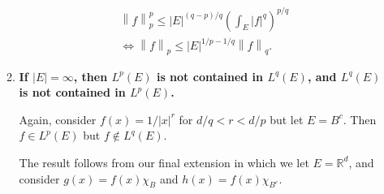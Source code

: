\documentclass[a4paper,12pt]{article}
\newcommand{\norm}[1]{\left\lVert#1\right\rVert}
\begin{document}
\begin{enumerate}
\begin{enumerate}
\begin{gather*}
                    \norm{f}_p^p \leq |E|^{(q - p) / q} \left( \int_E |f|^q \right)^{p/q} \\
                    \Leftrightarrow \norm{f}_p \leq |E|^{1/p - 1/q} \norm{f}_q.
                \end{gather*}
            \item
                \boldmath\textbf{If $|E| = \infty$, then $L^p(E)$ is not contained in $L^q(E)$, and $L^q(E)$ is not contained in $L^p(E)$.
                }\unboldmath \par
                Again, consider $f(x) = 1/|x|^r$ for $d/q < r < d/p$ but let $E = B^c$. Then $f \in L^p(E)$ but $f \notin L^q(E)$. \par
                The result follows from our final extension in which we let $E = \mathbb{R}^d$, and consider $g(x) = f(x) \chi_B$ and $h(x) = f(x) \chi_{B^c}$.
        \end{enumerate}
\end{enumerate}
\end{document}
